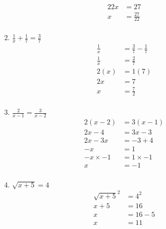 \documentclass{article}
\begin{document}
\begin{description}
\begin{enumerate}
\begin{equation}
\begin{split}
                          22x & = 27\\
                          x &=\frac{27}{22}\\
                      \end{split}
                  \end{equation}
            \item $\frac{1}{x} + \frac{1}{7} = \frac{3}{7}$
                  \begin{equation}
                      \begin{split}
                          \frac{1}{x} & = \frac{3}{7} - \frac{1}{7}\\
                          \frac{1}{x} & = \frac{2}{7} \\
                          2(x) & = 1(7) \\
                          2x & = 7 \\
                          x & = \frac{7}{2} \\
                      \end{split}
                  \end{equation}
            \item $\frac{2}{x-1} = \frac{3}{x-2}$
                  \begin{equation}
                      \begin{split}
                          2(x-2) & = 3(x-1)\\
                          2x-4 & = 3x - 3 \\
                          2x - 3x & = -3 + 4 \\
                          -x & = 1 \\
                          -x \times -1 & = 1 \times -1 \\
                          x & = -1\\
                      \end{split}
                  \end{equation}
            \item $\sqrt{x+5} = 4$
                  \begin{equation}
                      \begin{split}
                          \sqrt{x+5}^2& = 4 ^ 2\\
                          x+5 & = 16 \\
                          x & = 16  - 5 \\
                          x & = 11 \\

\end{split}
\end{equation}
\end{enumerate}
\end{description}
\end{document}
